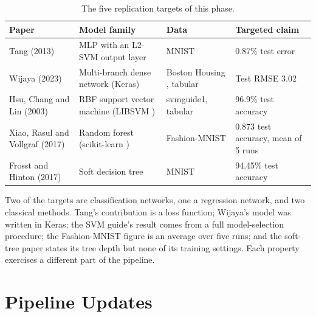 \documentclass[10pt,twocolumn]{article}
\begin{document}
\begin{table}[tbp]
\centering
\small
\caption{The five replication targets of this phase.}
\label{tab:targets}
\begin{tabular}{L{0.26\textwidth}L{0.22\textwidth}L{0.2\textwidth}L{0.2\textwidth}}
\toprule
Paper & Model family & Data & Targeted claim \\
\midrule
Tang (2013) \cite{tang2013dlsvm} & MLP with an L2-SVM output layer & MNIST & 0.87\% test error \\
Wijaya (2023) \cite{wijaya2023housing} & Multi-branch dense network (Keras) & Boston Housing
  \cite{harrison1978hedonic}, tabular & Test RMSE 3.02 \\
Hsu, Chang and Lin (2003) \cite{hsu2003guide} & RBF support vector machine (LIBSVM
  \cite{chang2011libsvm}) & svmguide1, tabular & 96.9\% test accuracy \\
Xiao, Rasul and Vollgraf (2017) \cite{xiao2017fashion} & Random forest (scikit-learn
  \cite{pedregosa2011sklearn}) & Fashion-MNIST & 0.873 test accuracy, mean of 5 runs \\
Frosst and Hinton (2017) \cite{frosst2017soft} & Soft decision tree & MNIST & 94.45\% test
  accuracy \\
\bottomrule
\end{tabular}
\end{table}

Two of the targets are classification networks, one a regression network, and two classical
methods. Tang's contribution is a loss function; Wijaya's model was written in Keras; the SVM
guide's result comes from a full model-selection procedure; the Fashion-MNIST figure is an
average over five runs; and the soft-tree paper states its tree depth but none of its training
settings. Each property exercises a different part of the pipeline.

\section{Pipeline Updates}
\label{sec:pipeline}
\end{document}
